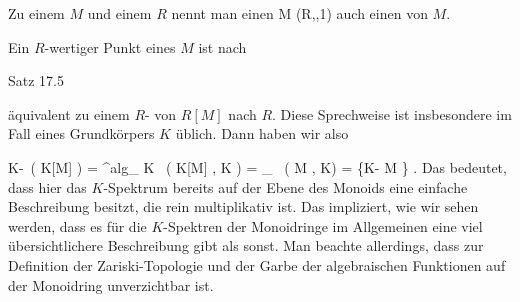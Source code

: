{ }
{





Zu einem
$M$ und einem
$R$ nennt man einen
\maabbdisp {} { M } { (R,\cdot,1)
} {}
auch einen
von $M$.





}

{ }
{





Ein $R$-wertiger Punkt eines
$M$ ist nach

Satz 17.5

äquivalent zu einem
$R$-
von $R[M]$ nach $R$. Diese Sprechweise ist insbesondere im Fall eines Grundkörpers $K$ üblich. Dann haben wir also

\mavergleichskettealign
{\vergleichskettealign
{ K\!-\!\, \left(  K[M]  \right)
}
{ =} { ^{\rm alg}_{ K } \, \left(  K[M] , K  \right)
}
{ =} { _{  } \, ( M ,  K)
}
{ =} { \{K- M \}
}
{ } {}
}
{}
{}{.}
Das bedeutet, dass hier das $K$-Spektrum bereits auf der Ebene des Monoids eine einfache Beschreibung besitzt, die rein multiplikativ ist. Das impliziert, wie wir sehen werden, dass es für die $K$-Spektren der Monoidringe im Allgemeinen eine viel übersichtlichere Beschreibung gibt als sonst. Man beachte allerdings, dass zur Definition der Zariski-Topologie und der Garbe der algebraischen Funktionen auf
 der Monoidring unverzichtbar ist.





}

